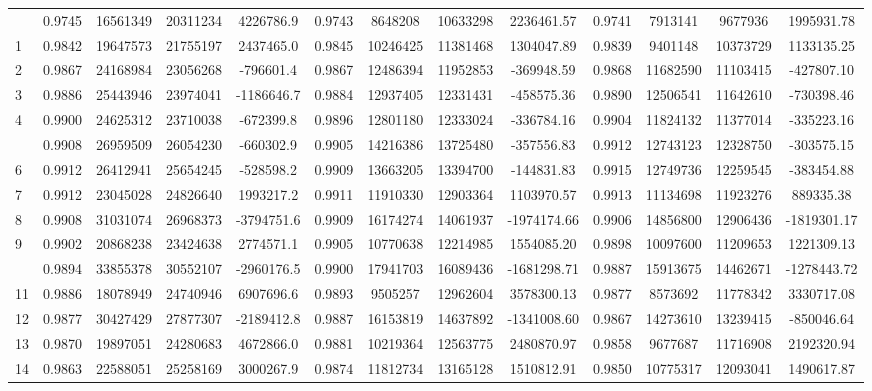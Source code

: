 \documentclass[
  12pt,
]{article}
\begin{document}
\begin{longtable}[t]{lcccccccccccc}
\endfoot
\bottomrule
\endlastfoot
0 & 0.9745 & 16561349 & 20311234 & 4226786.9 & 0.9743 & 8648208 & 10633298 & 2236461.57 & 0.9741 & 7913141 & 9677936 & 1995931.78\\
1 & 0.9842 & 19647573 & 21755197 & 2437465.0 & 0.9845 & 10246425 & 11381468 & 1304047.89 & 0.9839 & 9401148 & 10373729 & 1133135.25\\
2 & 0.9867 & 24168984 & 23056268 & -796601.4 & 0.9867 & 12486394 & 11952853 & -369948.59 & 0.9868 & 11682590 & 11103415 & -427807.10\\
3 & 0.9886 & 25443946 & 23974041 & -1186646.7 & 0.9884 & 12937405 & 12331431 & -458575.36 & 0.9890 & 12506541 & 11642610 & -730398.46\\
4 & 0.9900 & 24625312 & 23710038 & -672399.8 & 0.9896 & 12801180 & 12333024 & -336784.16 & 0.9904 & 11824132 & 11377014 & -335223.16\\
\addlinespace
5 & 0.9908 & 26959509 & 26054230 & -660302.9 & 0.9905 & 14216386 & 13725480 & -357556.83 & 0.9912 & 12743123 & 12328750 & -303575.15\\
6 & 0.9912 & 26412941 & 25654245 & -528598.2 & 0.9909 & 13663205 & 13394700 & -144831.83 & 0.9915 & 12749736 & 12259545 & -383454.88\\
7 & 0.9912 & 23045028 & 24826640 & 1993217.2 & 0.9911 & 11910330 & 12903364 & 1103970.57 & 0.9913 & 11134698 & 11923276 & 889335.38\\
8 & 0.9908 & 31031074 & 26968373 & -3794751.6 & 0.9909 & 16174274 & 14061937 & -1974174.66 & 0.9906 & 14856800 & 12906436 & -1819301.17\\
9 & 0.9902 & 20868238 & 23424638 & 2774571.1 & 0.9905 & 10770638 & 12214985 & 1554085.20 & 0.9898 & 10097600 & 11209653 & 1221309.13\\
\addlinespace
10 & 0.9894 & 33855378 & 30552107 & -2960176.5 & 0.9900 & 17941703 & 16089436 & -1681298.71 & 0.9887 & 15913675 & 14462671 & -1278443.72\\
11 & 0.9886 & 18078949 & 24740946 & 6907696.6 & 0.9893 & 9505257 & 12962604 & 3578300.13 & 0.9877 & 8573692 & 11778342 & 3330717.08\\
12 & 0.9877 & 30427429 & 27877307 & -2189412.8 & 0.9887 & 16153819 & 14637892 & -1341008.60 & 0.9867 & 14273610 & 13239415 & -850046.64\\
13 & 0.9870 & 19897051 & 24280683 & 4672866.0 & 0.9881 & 10219364 & 12563775 & 2480870.97 & 0.9858 & 9677687 & 11716908 & 2192320.94\\
14 & 0.9863 & 22588051 & 25258169 & 3000267.9 & 0.9874 & 11812734 & 13165128 & 1510812.91 & 0.9850 & 10775317 & 12093041 & 1490617.87\\

\end{longtable}
\end{document}
